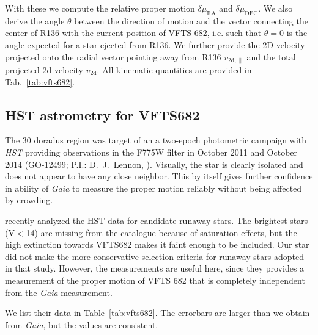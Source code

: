 \documentclass[apjl,twocolumn]{emulateapj}
\newcommand{\SdM}[1]{{{\color{brown}{#1}}}}
\DeclareRobustCommand{\Tabref}[1]{Table~\ref{#1}}
\begin{document}
With these we compute the relative proper motion $\delta\mu_\mathrm{RA}$ and $\delta\mu_\mathrm{DEC}$.  We also derive the angle $\theta$ between the direction of motion and the vector connecting the center of R136 with the current position of VFTS 682,  i.e. such that $\theta = 0$ is the angle expected for a star ejected from R136.    We further provide the 2D velocity projected onto the radial vector pointing away from R136 $v_\mathrm{2d, \parallel}$  and the total projected 2d velocity $v_\mathrm{2d}$.   All kinematic quantities are provided in Tab.~\ref{tab:vfts682}.


\subsection{HST astrometry for VFTS682}


The 30 doradus region was target of an a two-epoch photometric campaign with \emph{HST} providing observations in the F775W filter in October 2011 and October 2014 (GO-12499; P.I.: D.~J.~Lennon, \citealt{Sabbi+2013}). Visually, the star is clearly isolated and does not appear to have any close neighbor. This by itself gives further confidence in ability of \emph{Gaia} to measure the proper motion reliably without being affected by crowding. 


 \citet{platais:18} recently analyzed the HST data for candidate runaway stars. The brightest stars (V$<$14) are missing from the catalogue because of saturation effects, but the high extinction towards VFTS682 makes it faint enough to be included.
 Our star did not make the more conservative selection criteria for runaway stars adopted in that study. However, the measurements are useful here, since they provides a measurement of the proper motion of VFTS 682 that is completely independent from the \emph{Gaia} measurement. 
 
We list their data in \Tabref{tab:vfts682}.  The errorbars are larger than we obtain from \emph{Gaia}, but the values are consistent. \SdM{Actually they are not consistent with values found in one of Danny's emails. What is going on here?} 
\end{document}

